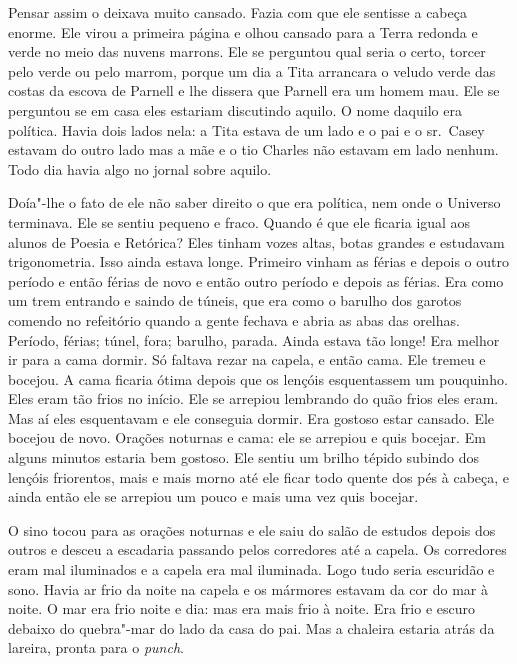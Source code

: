 Pensar assim o deixava muito cansado. Fazia com que ele sentisse a
cabeça enorme. Ele virou a primeira página e olhou cansado para a Terra
redonda e verde no meio das nuvens marrons. Ele se perguntou qual seria
o certo, torcer pelo verde ou pelo marrom, porque um dia a Tita
arrancara o veludo verde das costas da escova de Parnell e lhe dissera
que Parnell era um homem mau. Ele se perguntou se em casa eles estariam
discutindo aquilo. O nome daquilo era política. Havia dois lados nela:
a Tita estava de um lado e o pai e o sr.~Casey estavam do outro lado
mas a mãe e o tio Charles não estavam em lado nenhum. Todo dia havia
algo no jornal sobre aquilo.

Doía"-lhe o fato de ele não saber direito o que era política, nem onde o
Universo terminava. Ele se sentiu pequeno e fraco. Quando é que ele
ficaria igual aos alunos de Poesia e Retórica? Eles tinham vozes altas,
botas grandes e estudavam trigonometria. Isso ainda estava longe.
Primeiro vinham as férias e depois o outro período e então férias de
novo e então outro período e depois as férias. Era como um trem
entrando e saindo de túneis, que era como o barulho dos garotos comendo
no refeitório quando a gente fechava e abria as abas das orelhas.
Período, férias; túnel, fora; barulho, parada. Ainda estava tão longe!
Era melhor ir para a cama dormir. Só faltava rezar na capela, e então
cama. Ele tremeu e bocejou. A cama ficaria ótima depois que os lençóis
esquentassem um pouquinho. Eles eram tão frios no início. Ele se
arrepiou lembrando do quão frios eles eram. Mas aí eles esquentavam e
ele conseguia dormir. Era gostoso estar cansado. Ele bocejou de novo.
Orações noturnas e cama: ele se arrepiou e quis bocejar. Em alguns
minutos estaria bem gostoso. Ele sentiu um brilho tépido subindo dos
lençóis friorentos, mais e mais morno até ele ficar todo quente dos
pés à cabeça, e ainda então ele se arrepiou um pouco e mais uma vez
quis bocejar.

O sino tocou para as orações noturnas e ele saiu do salão de estudos
depois dos outros e desceu a escadaria passando pelos corredores até a
capela. Os corredores eram mal iluminados e a capela era mal iluminada.
Logo tudo seria escuridão e sono. Havia ar frio da noite na capela e os
mármores estavam da cor do mar à noite. O mar era frio noite e dia: mas
era mais frio à noite. Era frio e escuro debaixo do quebra"-mar do lado
da casa do pai. Mas a chaleira estaria atrás da lareira, pronta para o
\textit{punch}.                                                        

